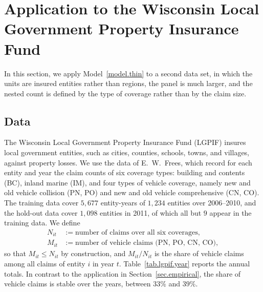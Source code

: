 \section{Application to the Wisconsin Local Government Property Insurance Fund}
\label{sec.lgpif}

In this section, we apply Model~\ref{model.thin} to a second data set,
in which the units are insured entities rather than regions, the panel
is much larger, and the nested count is defined by the type of
coverage rather than by the claim size.

\subsection{Data}
\label{sec.lgpif.data}

The Wisconsin Local Government Property Insurance Fund (LGPIF) insures
local government entities, such as cities, counties, schools, towns, and
villages, against property losses. We use the data of E.~W.~Frees, which
record for each entity and year the claim counts of six coverage types:
building and contents (BC), inland marine (IM), and four types of
vehicle coverage, namely new and old vehicle collision (PN, PO) and new
and old vehicle comprehensive (CN, CO).
The training data cover \(5{,}677\) entity-years of \(1{,}234\) entities
over 2006--2010, and the hold-out data cover \(1{,}098\) entities in 2011,
of which all but \(9\) appear in the training data. We define
\[
\begin{aligned}
N_{it}&:=\text{number of claims over all six coverages},\\
M_{it}&:=\text{number of vehicle claims (PN, PO, CN, CO)},
\end{aligned}
\]
so that \(M_{it}\le N_{it}\) by construction, and \(M_{it}/N_{it}\) is the
share of vehicle claims among all claims of entity \(i\) in year \(t\).
Table~\ref{tab.lgpif.year} reports the annual totals. In contrast to the
application in Section~\ref{sec.empirical}, the share of vehicle claims
is stable over the years, between \(33\%\) and \(39\%\).

